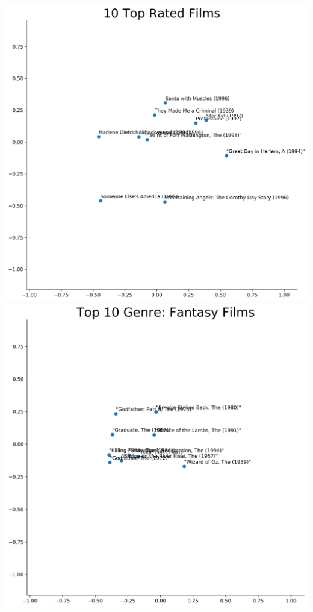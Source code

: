 \includegraphics[scale=0.35]{"10 Top Rated Films"}
\includegraphics[scale=0.35]{"Top 10 Genre: Fantasy Films"} \\ \\
